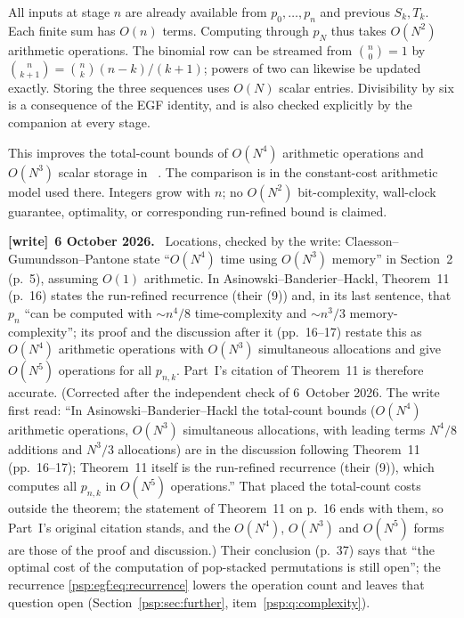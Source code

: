 \documentclass[11pt,letterpaper]{article}
\numberwithin{equation}{section}
\theoremstyle{remark}\newtheorem{remark}[theorem]{Remark}
\newenvironment{writenote}[1][]{\par\smallskip\begingroup\small
 \noindent\textbf{[write]}\if\relax\detokenize{#1}\relax\else~\textbf{#1.}\fi\ }%
 {\par\endgroup\smallskip}
\begin{document}
All inputs at stage $n$ are already available from $p_0,\ldots,p_n$ and
previous $S_k,T_k$. Each finite sum has $O(n)$ terms. Computing through
$p_N$ thus takes $O(N^2)$ arithmetic operations. The binomial row can be
streamed from $\binom n0=1$ by
$\binom n{k+1}=\binom nk(n-k)/(k+1)$; powers of two can likewise be
updated exactly. Storing the three sequences uses $O(N)$ scalar entries.
Divisibility by six is a consequence of the EGF identity, and is also
checked explicitly by the companion at every stage.

This improves the total-count bounds of $O(N^4)$ arithmetic operations
and $O(N^3)$ scalar storage in~\cite[Section 2]{cgp}
\cite[Theorem 11]{abh}. The comparison is in the constant-cost arithmetic
model used there. Integers grow with $n$; no $O(N^2)$ bit-complexity,
wall-clock guarantee, optimality, or corresponding run-refined bound is
claimed.
\begin{writenote}[6 October 2026]
Locations, checked by the write: Claesson--Gu\dh mundsson--Pantone state ``$O(N^4)$ time using $O(N^3)$ memory'' in Section~2 (p.~5), assuming $O(1)$ arithmetic. In Asinowski--Banderier--Hackl, Theorem~11 (p.~16) states the run-refined recurrence (their (9)) and, in its last sentence, that $p_n$ ``can be computed with $\sim n^4/8$ time-complexity and $\sim n^3/3$ memory-complexity''; its proof and the discussion after it (pp.~16--17) restate this as $O(N^4)$ arithmetic operations with $O(N^3)$ simultaneous allocations and give $O(N^5)$ operations for all $p_{n,k}$. Part~I's citation of Theorem~11 is therefore accurate. \textup{(Corrected after the independent check of 6~October 2026. The write first read: ``In Asinowski--Banderier--Hackl the total-count bounds ($O(N^4)$ arithmetic operations, $O(N^3)$ simultaneous allocations, with leading terms $N^4/8$ additions and $N^3/3$ allocations) are in the discussion following Theorem~11 (pp.~16--17); Theorem~11 itself is the run-refined recurrence (their (9)), which computes all $p_{n,k}$ in $O(N^5)$ operations.'' That placed the total-count costs outside the theorem; the statement of Theorem~11 on p.~16 ends with them, so Part~I's original citation \cite[Theorem 11]{abh} stands, and the $O(N^4)$, $O(N^3)$ and $O(N^5)$ forms are those of the proof and discussion.)} Their conclusion (p.~37) says that ``the optimal cost of the computation of pop-stacked permutations is still open''; the recurrence \eqref{psp:egf:eq:recurrence} lowers the operation count and leaves that question open (Section~\ref{psp:sec:further}, item~\ref{psp:q:complexity}).
\end{writenote}
\end{document}

